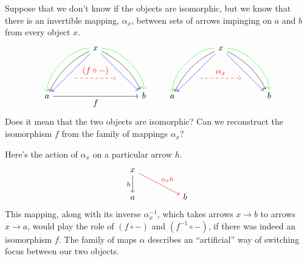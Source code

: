 \documentclass[DaoFP]{subfiles}
\begin{document}
Suppose that we don't know if the objects are isomorphic, but we know that there is an invertible mapping, $\alpha_x$, between sets of arrows impinging on $a$ and $b$ from every object $x$. 
\[
 \begin{tikzcd}
 \node(x) at (0, 2) {x};
 \node(a) at (-2, 0) {a};
 \node(b) at (2, 0) {b};
 \node(c1) at (-1, 1.5) {};
 \node(c2) at (-1.5, 1) {};
 \node(c3) at (-1, 2) {};
 \node(c4) at (-2, 1) {};
 \node(d1) at (1, 1.5) {};
 \node(d2) at (1.5, 1) {};
 \node(d3) at (1, 2) {};
 \node(d4) at (2, 1) {};
\node (aa) at (-1, 0.75) {};
 \node (bb) at (1, 0.75) {};
 \draw[->] (x) .. controls (c1)  and (c2) .. (a); %
 \draw[->, green] (x) .. controls (c3)  and (c4) .. (a); %
 \draw[->, blue] (x) -- (a); 
  \draw[->] (x) .. controls (d1)  and (d2) .. (b); %
 \draw[->, green] (x) .. controls (d3)  and (d4) .. (b); %
 \draw[->, blue] (x) -- (b); 
 \draw[->, red, dashed] (aa) -- node[above]{(f \circ -)} (bb);
\draw[->] (a) -- node[below]{f} (b);
 \end{tikzcd}
 \qquad
 \begin{tikzcd}
 \node(x) at (0, 2) {x};
 \node(a) at (-2, 0) {a};
 \node(b) at (2, 0) {b};
 \node(c1) at (-1, 1.5) {};
 \node(c2) at (-1.5, 1) {};
 \node(c3) at (-1, 2) {};
 \node(c4) at (-2, 1) {};
 \node(d1) at (1, 1.5) {};
 \node(d2) at (1.5, 1) {};
 \node(d3) at (1, 2) {};
 \node(d4) at (2, 1) {};
\node (aa) at (-1, 0.75) {};
 \node (bb) at (1, 0.75) {};
 \draw[->] (x) .. controls (c1)  and (c2) .. (a); %
 \draw[->, green] (x) .. controls (c3)  and (c4) .. (a); %
 \draw[->, blue] (x) -- (a); 
  \draw[->] (x) .. controls (d1)  and (d2) .. (b); %
 \draw[->, green] (x) .. controls (d3)  and (d4) .. (b); %
 \draw[->, blue] (x) -- (b); 
 \draw[->, red, dashed] (aa) -- node[above]{\alpha_x} (bb);
 \end{tikzcd}
\]
Does it mean that the two objects are isomorphic? Can we reconstruct the isomorphism $f$ from the family of mappings $\alpha_x$?

Here's the action of $\alpha_x$ on a particular arrow $h$. 
\[
 \begin{tikzcd}
 x
 \arrow[d, "h"']
 \arrow[rrd, red, "\alpha_x h"]
  \\
 a
  && b
 \end{tikzcd}
\]
This mapping, along with its inverse $\alpha^{-1}_x$, which takes arrows $x \to b$ to arrows $x \to a$, would play the role of $(f \circ -)$ and $(f^{-1} \circ -)$, if there was indeed an isomorphism $f$. The family of maps $\alpha$ describes an ``artificial'' way of switching focus between our two objects.
\end{document}
